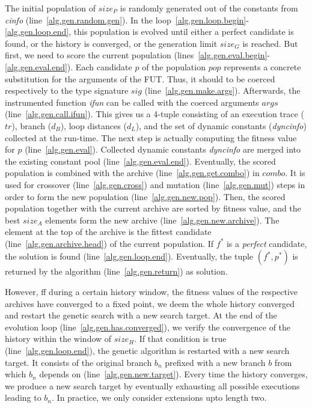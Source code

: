 The initial population of $size_P$ is randomly generated out of the constants from \emph{cinfo} (line~\ref{alg.gen.random.gen}). In the loop~\ref{alg.gen.loop.begin}-\ref{alg.gen.loop.end}, this population is evolved until either a perfect candidate is found, or the history is converged, or the generation limit $size_G$ is reached. But first, we need to score the current population (lines~\ref{alg.gen.eval.begin}-\ref{alg.gen.eval.end}). Each candidate $p$ of the population $pop$ represents a concrete substitution for the arguments of the FUT. Thus, it should to be coerced respectively to the type signature $sig$ (line~\ref{alg.gen.make.args}). Afterwards, the instrumented function \emph{ifun} can be called with the coerced arguments $args$ (line~\ref{alg.gen.call.ifun}). This gives us a 4-tuple consisting of an execution trace ($tr$), branch ($d_B$), loop distances ($d_L$), and the set of dynamic constants (\emph{dyncinfo}) collected at the run-time. The next step is actually computing the fitness value for $p$ (line~\ref{alg.gen.eval}). Collected dynamic constants \emph{dyncinfo} are merged into the existing constant pool (line~\ref{alg.gen.eval.end}). Eventually, the scored population is combined with the archive (line~\ref{alg.gen.get.combo}) in $combo$. It is used for crossover (line~\ref{alg.gen.cross}) and mutation (line~\ref{alg.gen.mut}) steps in order to form the new population (line~\ref{alg.gen.new.pop}). Then, the scored population together with the current archive are sorted by fitness value, and the best $size_A$ elements form the new archive (line~\ref{alg.gen.new.archive}). The element at the top of the archive is the fittest candidate (line~\ref{alg.gen.archive.head}) of the current population. If $f^*$ is a \emph{perfect} candidate, the solution is found (line~\ref{alg.gen.loop.end}). Eventually, the tuple $(f^*, p^*)$ is returned by the algorithm (line~\ref{alg.gen.return}) as solution.

However, ff during a certain history window, the fitness values of the respective archives have converged to a fixed point, we deem the whole history converged and restart the genetic search with a new search target. At the end of the evolution loop (line~\ref{alg.gen.has.converged}), we verify the convergence of the history within the window of $size_H$. If that condition is true (line~\ref{alg.gen.loop.end}), the genetic algorithm is restarted with a new search target. It consists of the original branch $b_n$ prefixed with a new branch $b$ from which $b_n$ depends on (line~\ref{alg.gen.new.target}). Every time the history converges, we produce a new search target by eventually exhausting all possible executions leading to $b_n$. In practice, we only consider extensions upto length two.

